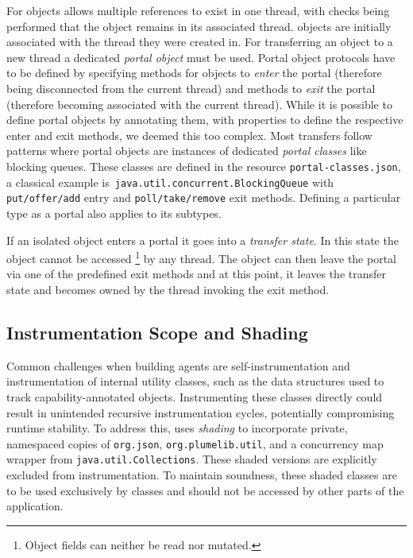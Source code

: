For \Isolated objects \jdala allows multiple references to exist in one thread, with checks being performed that the object remains in its associated thread. \Isolated objects are initially associated with the thread they were created in. For transferring an \Isolated object to a new thread a dedicated \textit{portal object} must be used. Portal object protocols have to be defined by specifying methods for objects to \textit{enter} the portal (therefore being disconnected from the current thread) and methods to \textit{exit} the portal (therefore becoming associated with the current thread).  While it is possible to define portal objects by annotating them, with properties to define the respective enter and exit methods, we deemed this too complex. Most transfers follow patterns where portal objects are instances of dedicated \textit{portal classes} like blocking queues.  
These classes are defined in the resource \texttt{portal-classes.json}, a classical example is\texttt{ java.util.concurrent.BlockingQueue} with \texttt{put/\-offer/\-add} entry  and \texttt{poll/\-take/\-remove} exit methods. Defining a particular type as a portal also applies to its subtypes. 

If an isolated object enters a portal it goes into a \textit{transfer state}. In this state the object cannot be accessed \footnote{Object fields can neither be read nor mutated.} by any thread. The object can then leave the portal via one of the predefined exit methods and at this point, it leaves the transfer state and becomes owned by the thread invoking the exit method.


\subsection{Instrumentation Scope and Shading}

Common challenges when building agents are self-instrumentation and instrumentation of internal utility classes, such as the data structures used to track capability-annotated objects. Instrumenting these classes directly could result in unintended recursive instrumentation cycles, potentially compromising runtime stability. To address this, \jdala uses \textit{shading} to incorporate private, namespaced copies of \texttt{org.json}, \texttt{org.plumelib.util}, and a concurrency map wrapper from \texttt{java.util.Collections}. These shaded versions are explicitly excluded from instrumentation. To maintain soundness, these shaded classes are to be used exclusively by \jdala classes and should not be accessed by other parts of the application. 

